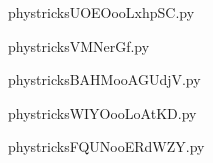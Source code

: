     

    \clearpage
    


    \newcommand{\CaptionFigUOEOooLxhpSC}{<+Type your caption here+>}
    \begin{center}
        
    \end{center}
    phystricksUOEOooLxhpSC.py

    

    \clearpage
    


    \newcommand{\CaptionFigVMNerGf}{<+Type your caption here+>}
    \begin{center}
        
    \end{center}
    phystricksVMNerGf.py

    

    \clearpage
    


    \newcommand{\CaptionFigBAHMooAGUdjV}{<+Type your caption here+>}
    \begin{center}
        
    \end{center}
    phystricksBAHMooAGUdjV.py

    

    \clearpage
    


    \newcommand{\CaptionFigWIYOooLoAtKD}{<+Type your caption here+>}
    \begin{center}
        
    \end{center}
    phystricksWIYOooLoAtKD.py

    

    \clearpage
    


    \newcommand{\CaptionFigFQUNooERdWZY}{<+Type your caption here+>}
    \begin{center}
        
    \end{center}
    phystricksFQUNooERdWZY.py

    

    \clearpage
    


